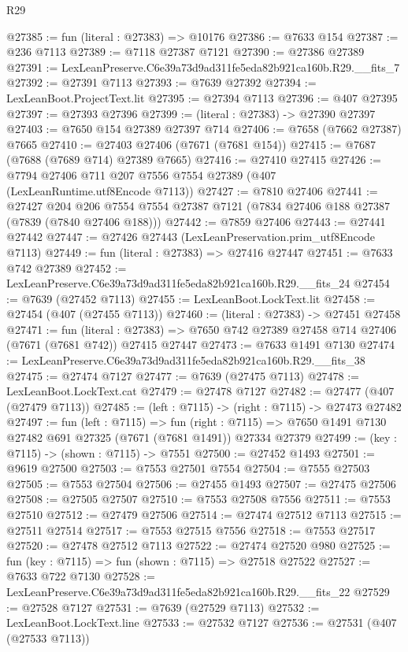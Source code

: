 \begin{lexlean}{R29}
\begin{coremodule}
@27385 := fun (literal : @27383) => @10176
@27386 := @7633 @154
@27387 := @236 @7113
@27389 := @7118 @27387 @7121
@27390 := @27386 @27389
@27391 := LexLeanPreserve.C6e39a73d9ad311fe5eda82b921ca160b.R29.__fits_7
@27392 := @27391 @7113
@27393 := @7639 @27392
@27394 := LexLeanBoot.ProjectText.lit
@27395 := @27394 @7113
@27396 := @407 @27395
@27397 := @27393 @27396
@27399 := (literal : @27383) -> @27390 @27397
@27403 := @7650 @154 @27389 @27397 @714
@27406 := @7658 (@7662 @27387) @7665
@27410 := @27403 @27406 (@7671 (@7681 @154))
@27415 := @7687 (@7688 (@7689 @714) @27389 @7665)
@27416 := @27410 @27415
@27426 := @7794 @27406 @711 @207 @7556 @7554 @27389 (@407 (LexLeanRuntime.utf8Encode @7113))
@27427 := @7810 @27406
@27441 := @27427
    @204
    @206
    @7554
    @7554
    @27387
    @7121
    (@7834 @27406 @188 @27387 (@7839 (@7840 @27406 @188)))
@27442 := @7859 @27406
@27443 := @27441 @27442
@27447 := @27426 @27443 (LexLeanPreservation.prim_utf8Encode @7113)
@27449 := fun (literal : @27383) => @27416 @27447
@27451 := @7633 @742 @27389
@27452 := LexLeanPreserve.C6e39a73d9ad311fe5eda82b921ca160b.R29.__fits_24
@27454 := @7639 (@27452 @7113)
@27455 := LexLeanBoot.LockText.lit
@27458 := @27454 (@407 (@27455 @7113))
@27460 := (literal : @27383) -> @27451 @27458
@27471 := fun (literal : @27383) =>
  @7650 @742 @27389 @27458 @714 @27406 (@7671 (@7681 @742)) @27415 @27447
@27473 := @7633 @1491 @7130
@27474 := LexLeanPreserve.C6e39a73d9ad311fe5eda82b921ca160b.R29.__fits_38
@27475 := @27474 @7127
@27477 := @7639 (@27475 @7113)
@27478 := LexLeanBoot.LockText.cat
@27479 := @27478 @7127
@27482 := @27477 (@407 (@27479 @7113))
@27485 := (left : @7115) -> (right : @7115) -> @27473 @27482
@27497 := fun (left : @7115) =>
  fun (right : @7115) => @7650 @1491 @7130 @27482 @691 @27325 (@7671 (@7681 @1491)) @27334 @27379
@27499 := (key : @7115) -> (shown : @7115) -> @7551
@27500 := @27452 @1493
@27501 := @9619 @27500
@27503 := @7553 @27501 @7554
@27504 := @7555 @27503
@27505 := @7553 @27504
@27506 := @27455 @1493
@27507 := @27475 @27506
@27508 := @27505 @27507
@27510 := @7553 @27508 @7556
@27511 := @7553 @27510
@27512 := @27479 @27506
@27514 := @27474 @27512 @7113
@27515 := @27511 @27514
@27517 := @7553 @27515 @7556
@27518 := @7553 @27517
@27520 := @27478 @27512 @7113
@27522 := @27474 @27520 @980
@27525 := fun (key : @7115) => fun (shown : @7115) => @27518 @27522
@27527 := @7633 @722 @7130
@27528 := LexLeanPreserve.C6e39a73d9ad311fe5eda82b921ca160b.R29.__fits_22
@27529 := @27528 @7127
@27531 := @7639 (@27529 @7113)
@27532 := LexLeanBoot.LockText.line
@27533 := @27532 @7127
@27536 := @27531 (@407 (@27533 @7113))

\end{coremodule}
\end{lexlean}

